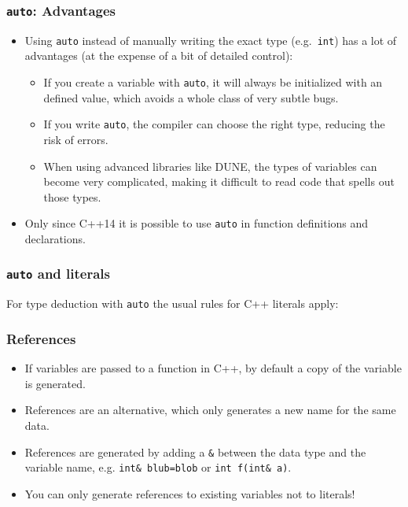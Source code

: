 \documentclass[aspectratio=169,ignorenonframetext,11pt]{beamer}
\def\inline{\lstinline[basicstyle=\small\ttfamily]}
\begin{document}
\begin{frame}[fragile]
\frametitle{\texttt{auto}: Advantages}

\begin{itemize}
\item Using \inline!auto! instead of manually writing the exact type (e.g.~\inline!int!) has a lot of advantages (at the expense of a bit of detailed control):
\begin{itemize}
\item If you create a variable with \inline!auto!, it will always be initialized with an defined value, which avoids a whole class of very subtle bugs.
\item If you write \inline!auto!, the compiler can choose the right type, reducing the risk of errors.
\item When using advanced libraries like DUNE, the types of variables can become very complicated, making it difficult to read code that spells out those types.
\end{itemize}
\item Only since C++14 it is possible to use \inline!auto! in function definitions and declarations.
\end{itemize}

\end{frame}

\begin{frame}
\frametitle{\texttt{auto} and literals}

For type deduction with \inline!auto! the usual rules for C++ literals apply:

\begin{codeblock}
  
\end{codeblock}
\end{frame}

\begin{frame}[fragile]
  \frametitle{References}
  \begin{itemize}
  \item If variables are passed to a function in C++, by default a copy of the variable is generated. 
  \item References are an alternative, which only generates a new name for the same data. 
  \item References are generated by adding a \inline!&! between the data type and the variable name, e.g. \inline!int& blub=blob! or \inline!int f(int& a)!. 
  \item You can only generate references to existing variables not to literals!
  \end{itemize}
  
\end{frame}
\end{document}
